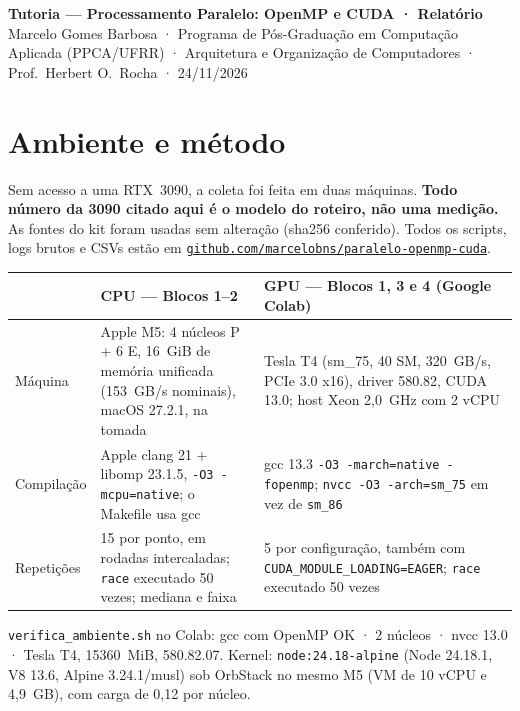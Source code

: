 \documentclass[10pt,a4paper]{article}
\begin{document}
{\large\bfseries Tutoria — Processamento Paralelo: OpenMP e CUDA · Relatório}\\[1pt]
{\small Marcelo Gomes Barbosa · Programa de Pós-Graduação em Computação Aplicada (PPCA/UFRR) · Arquitetura e Organização de Computadores · Prof.\ Herbert O.\ Rocha · 24/11/2026}

\vspace{2pt}

\section{Ambiente e método}
Sem acesso a uma RTX~3090, a coleta foi feita em duas máquinas. \textbf{Todo número da 3090 citado aqui é o modelo do roteiro, não uma medição.}
As fontes do kit foram usadas sem alteração (sha256 conferido). Todos os scripts, logs brutos e CSVs estão em \href{https://github.com/marcelobns/paralelo-openmp-cuda}{\texttt{github.com/marcelobns/paralelo-openmp-cuda}}.

{\small
\begin{tabular}{@{}P{2.0cm}P{7.9cm}P{7.7cm}@{}}
\toprule
 & \textbf{CPU} — Blocos 1–2 & \textbf{GPU} — Blocos 1, 3 e 4 (Google Colab) \\
\midrule
Máquina & Apple M5: 4 núcleos P + 6 E, 16~GiB de memória unificada (153~GB/s nominais), macOS 27.2.1, na tomada &
Tesla T4 (sm\_75, 40 SM, 320~GB/s, PCIe 3.0 x16), driver 580.82, CUDA 13.0; host Xeon 2,0~GHz com 2 vCPU \\
Compilação & Apple clang 21 + libomp 23.1.5, \texttt{-O3 -mcpu=native}; o Makefile usa gcc &
gcc 13.3 \texttt{-O3 -march=native -fopenmp}; \texttt{nvcc -O3 -arch=sm\_75} em vez de \texttt{sm\_86} \\
Repetições & 15 por ponto, em rodadas intercaladas; \texttt{race} executado 50 vezes; mediana e faixa &
5 por configuração, também com \texttt{CUDA\_MODULE\_LOADING=EAGER}; \texttt{race} executado 50 vezes \\
\bottomrule
\end{tabular}}

{\footnotesize\texttt{verifica\_ambiente.sh} no Colab: gcc com OpenMP OK · 2 núcleos · nvcc 13.0 · Tesla T4, 15360~MiB, 580.82.07.
Kernel: \texttt{node:24.18-alpine} (Node 24.18.1, V8 13.6, Alpine 3.24.1/musl) sob OrbStack no mesmo M5 (VM de 10 vCPU e 4,9~GB), com carga de 0,12 por núcleo.}
\end{document}

